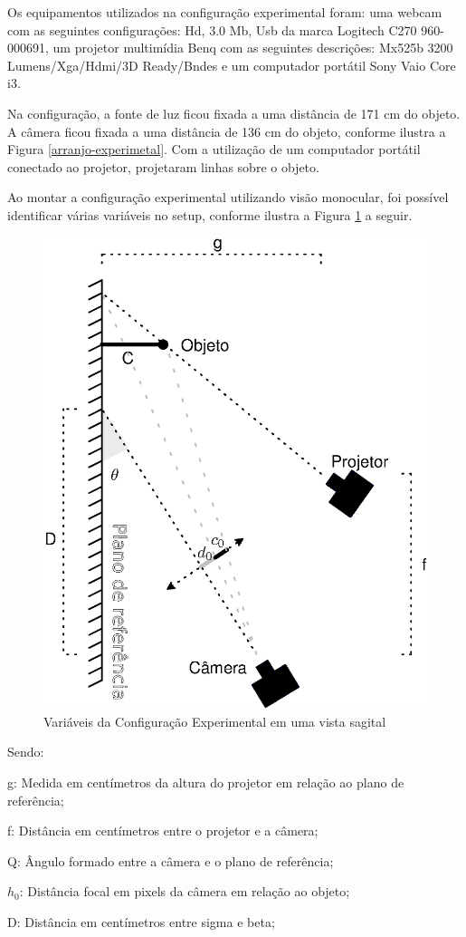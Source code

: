 \documentclass[a4paper, 12pt]{article}
\begin{document}
Os equipamentos utilizados na configuração experimental foram: uma webcam com as seguintes configurações: Hd, 3.0 Mb, Usb da marca Logitech C270 960-000691, um projetor multimídia Benq com as seguintes descrições: Mx525b 3200 Lumens/Xga/Hdmi/3D Ready/Bndes e um computador portátil Sony Vaio Core i3. 

Na configuração, a fonte de luz ficou fixada a uma distância de 171 cm do objeto. A câmera ficou fixada a uma distância de 136 cm do objeto, conforme ilustra a Figura \ref{arranjo-experimetal}.  Com a utilização de um computador portátil conectado ao projetor, projetaram linhas sobre o objeto.

Ao montar a configuração experimental utilizando visão monocular, foi possível identificar várias variáveis no setup, conforme ilustra a Figura \ref{setup com as variaveis} a seguir.

\begin{figure}[H]
	\centering
		\includegraphics[width=.55\linewidth]{vista_sagital.eps}
	\caption{Variáveis da Configuração Experimental em uma vista sagital}
	\label{setup com as variaveis}
\end{figure}

Sendo:

g: Medida em centímetros da altura do projetor em relação ao plano de referência;

f:  Distância em centímetros entre o projetor e a câmera;	          

Q: Ângulo formado entre a câmera e o plano de referência;

$h_0$: Distância focal em pixels da câmera em relação ao objeto;  

D:  Distância em centímetros entre sigma e beta;
\end{document}
